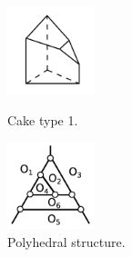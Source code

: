 \documentclass[suppldata, dvipdfmx]{interact}
\theoremstyle{plain}%
\theoremstyle{definition}
\theoremstyle{remark}
\theoremstyle{problemstyle}
\begin{document}
\begin{figure}[h!tbp]
  \begin{minipage}[t]{0.5\textwidth}
   \centering
   \includegraphics[width=1in,
   keepaspectratio]{./img/HexahedraWithSphericalFaces/hexahedralCake1/cake1.jpg}
   \caption{Cake type 1.}
   \label{fig:cake1}
  \end{minipage}
 \hspace*{\fill}
  \begin{minipage}[t]{0.5\textwidth}
   \centering
   \includegraphics[width=1in, keepaspectratio]{./img/HexahedraWithSphericalFaces/hexahedralCake1/faces.jpg}
   \caption{Polyhedral structure.}
   \label{fig:hexahedralCake1Graph}
  \end{minipage}
\end{figure}
\end{document}
